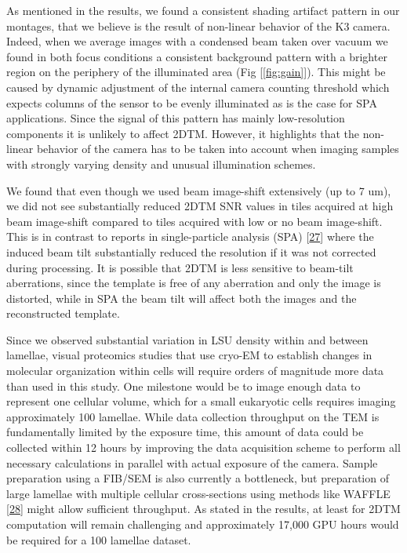 \documentclass[
]{article}
\begin{document}
As mentioned in the results, we found a consistent shading artifact pattern in our montages, that we believe is the result of non-linear behavior of the K3 camera. Indeed, when we average images with a condensed beam taken over vacuum we found in both focus conditions a consistent background pattern with a brighter region on the periphery of the illuminated area (Fig {[}\ref{fig:gain}{]}). This might be caused by dynamic adjustment of the internal camera counting threshold which expects columns of the sensor to be evenly illuminated as is the case for SPA applications. Since the signal of this pattern has mainly low-resolution components it is unlikely to affect 2DTM. However, it highlights that the non-linear behavior of the camera has to be taken into account when imaging samples with strongly varying density and unusual illumination schemes.

We found that even though we used beam image-shift extensively (up to 7 um), we did not see substantially reduced 2DTM SNR values in tiles acquired at high beam image-shift compared to tiles acquired with low or no beam image-shift. This is in contrast to reports in single-particle analysis (SPA) {[}\protect\hyperlink{ref-44fG6kcy}{27}{]} where the induced beam tilt substantially reduced the resolution if it was not corrected during processing. It is possible that 2DTM is less sensitive to beam-tilt aberrations, since the template is free of any aberration and only the image is distorted, while in SPA the beam tilt will affect both the images and the reconstructed template.

Since we observed substantial variation in LSU density within and between lamellae, visual proteomics studies that use cryo-EM to establish changes in molecular organization within cells will require orders of magnitude more data than used in this study. One milestone would be to image enough data to represent one cellular volume, which for a small eukaryotic cells requires imaging approximately 100 lamellae. While data collection throughput on the TEM is fundamentally limited by the exposure time, this amount of data could be collected within 12 hours by improving the data acquisition scheme to perform all necessary calculations in parallel with actual exposure of the camera. Sample preparation using a FIB/SEM is also currently a bottleneck, but preparation of large lamellae with multiple cellular cross-sections using methods like WAFFLE {[}\protect\hyperlink{ref-17H2LWiIu}{28}{]} might allow sufficient throughput. As stated in the results, at least for 2DTM computation will remain challenging and approximately 17,000 GPU hours would be required for a 100 lamellae dataset.
\end{document}
